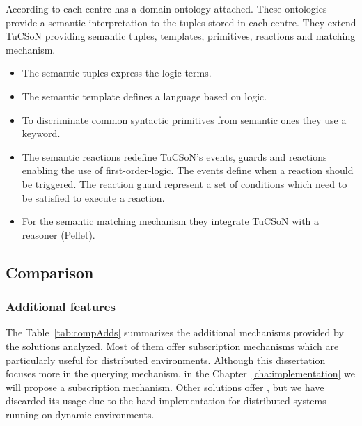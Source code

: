 According to \citeauthor{nardini_semantic_2013} each centre has a domain ontology attached.
These ontologies provide a semantic interpretation to the tuples stored in each centre.
They extend TuCSoN providing semantic tuples, templates, primitives, reactions and matching mechanism.
\begin{itemize}
  \item The semantic tuples express the logic terms.
  \item The semantic template defines a language based on logic.
  \item To discriminate common syntactic primitives from semantic ones they use a keyword.
  \item The semantic reactions redefine TuCSoN's events, guards and reactions enabling the use of first-order-logic.
	The events define when a reaction should be triggered.
	The reaction guard represent a set of conditions which need to be satisfied to execute a reaction.
  \item For the semantic matching mechanism they integrate TuCSoN with a reasoner (Pellet). %
\end{itemize}



\subsection{Comparison}





\subsubsection{Additional features}

The Table~\ref{tab:compAdds} summarizes the additional mechanisms provided by the solutions analyzed.
Most of them offer subscription mechanisms which are particularly useful for distributed environments.
Although this dissertation focuses more in the querying mechanism, in the Chapter~\ref{cha:implementation} we will propose a subscription mechanism.
Other solutions offer , but we have discarded its usage due to the hard implementation for distributed systems running on dynamic environments.







